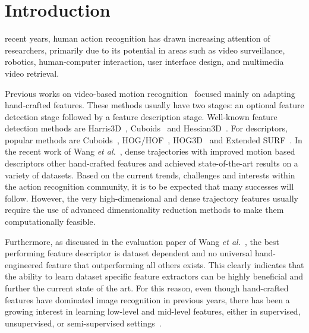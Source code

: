 

\section{Introduction}
\label{sec:introduction}

 recent years, human action recognition has drawn increasing attention of researchers, primarily due to its potential in areas such as video surveillance, robotics, human-computer interaction, user interface design, and multimedia video retrieval.

Previous works on video-based motion recognition~\cite{liuli,xiantong,diwu2} focused mainly on adapting hand-crafted features. %
These methods usually have two stages: an optional feature detection stage followed by a feature description stage. Well-known feature detection methods are Harris3D~\cite{laptev2005space}, Cuboids~\cite{dollar2005behavior} and Hessian3D~\cite{hession3d}. For descriptors, popular methods are Cuboids~\cite{scovanner20073}, HOG/HOF~\cite{laptev2005space}, HOG3D~\cite{klaser:inria-00514853} and Extended SURF~\cite{hession3d}.
In the recent work of Wang \textit{et al.}~\cite{wang2013dense}, dense trajectories with improved motion based descriptors other hand-crafted features and achieved state-of-the-art results on a variety of datasets.
Based on the current trends, challenges and interests within the action recognition community, it is to be expected that many successes will follow. However, the very high-dimensional and dense trajectory features usually require the use of advanced dimensionality reduction methods to make them computationally feasible.

Furthermore, as discussed in the evaluation paper of Wang \emph{et al.}~\cite{wang2009evaluation}, the best performing feature descriptor is dataset dependent and no universal hand-engineered feature that outperforming all others exists. This clearly indicates that the ability to learn dataset specific feature extractors can be highly beneficial and further the current state of the art.
For this reason, even though hand-crafted features have dominated image recognition in previous years, there has been a growing interest in learning low-level and mid-level features, either in supervised, unsupervised, or semi-supervised settings~\cite{taylor2010convolutional,le2011learning,baccouche2005spatio}.


